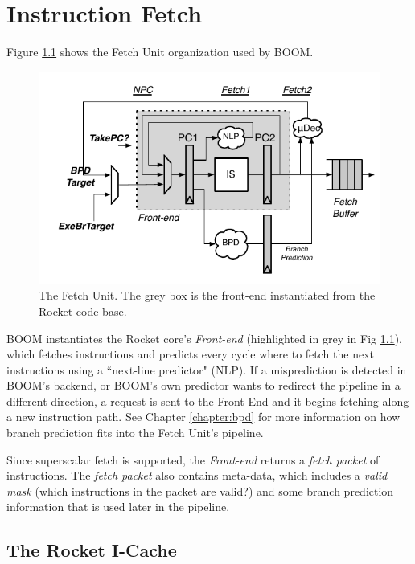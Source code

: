 \chapter {Instruction Fetch}

Figure \ref{fig:fetch} shows the Fetch Unit organization used by BOOM. 

\begin{figure}[ht]
	\centering
	\centerline{\includegraphics[scale =1] {figures/frontend}}
	\caption{ \small The Fetch Unit. The grey box is the front-end instantiated from the Rocket code base.}
	\label{fig:fetch}
\end{figure}

BOOM instantiates the Rocket core's {\em Front-end} (highlighted in grey in Fig \ref{fig:fetch}), which fetches instructions and predicts every cycle where to fetch the next instructions using a ``next-line predictor" (NLP). If a misprediction is detected in BOOM's backend, or BOOM's own predictor wants to redirect the pipeline in a different direction, a request is sent to the Front-End and it begins fetching along a new instruction path.  See Chapter \ref{chapter:bpd} for more information on how branch prediction fits into the Fetch Unit's pipeline. 

Since superscalar fetch is supported, the {\em Front-end} returns a {\em fetch packet} of instructions.  The {\em fetch packet} also contains meta-data, which includes a {\em valid mask} (which instructions in the packet are valid?) and some branch prediction information that is used later in the pipeline. 

\section{The Rocket I-Cache}

